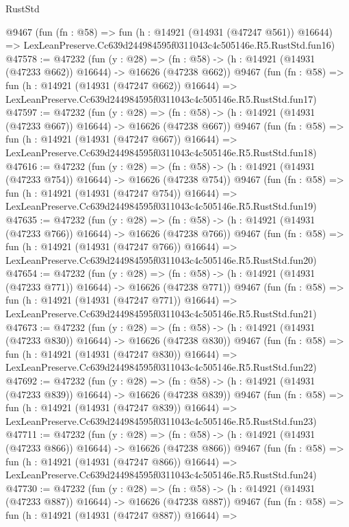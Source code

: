 \begin{lexlean}{RustStd}
\begin{coremodule}
    @9467
    (fun (fn : @58) =>
    fun (h : @14921 (@14931 (@47247 @561)) @16644) =>
    LexLeanPreserve.Cc639d244984595f0311043c4c505146e.R5.RustStd.fun16)
@47578 := @47232
    (fun (y : @28) =>
    (fn : @58) -> (h : @14921 (@14931 (@47233 @662)) @16644) -> @16626 (@47238 @662))
    @9467
    (fun (fn : @58) =>
    fun (h : @14921 (@14931 (@47247 @662)) @16644) =>
    LexLeanPreserve.Cc639d244984595f0311043c4c505146e.R5.RustStd.fun17)
@47597 := @47232
    (fun (y : @28) =>
    (fn : @58) -> (h : @14921 (@14931 (@47233 @667)) @16644) -> @16626 (@47238 @667))
    @9467
    (fun (fn : @58) =>
    fun (h : @14921 (@14931 (@47247 @667)) @16644) =>
    LexLeanPreserve.Cc639d244984595f0311043c4c505146e.R5.RustStd.fun18)
@47616 := @47232
    (fun (y : @28) =>
    (fn : @58) -> (h : @14921 (@14931 (@47233 @754)) @16644) -> @16626 (@47238 @754))
    @9467
    (fun (fn : @58) =>
    fun (h : @14921 (@14931 (@47247 @754)) @16644) =>
    LexLeanPreserve.Cc639d244984595f0311043c4c505146e.R5.RustStd.fun19)
@47635 := @47232
    (fun (y : @28) =>
    (fn : @58) -> (h : @14921 (@14931 (@47233 @766)) @16644) -> @16626 (@47238 @766))
    @9467
    (fun (fn : @58) =>
    fun (h : @14921 (@14931 (@47247 @766)) @16644) =>
    LexLeanPreserve.Cc639d244984595f0311043c4c505146e.R5.RustStd.fun20)
@47654 := @47232
    (fun (y : @28) =>
    (fn : @58) -> (h : @14921 (@14931 (@47233 @771)) @16644) -> @16626 (@47238 @771))
    @9467
    (fun (fn : @58) =>
    fun (h : @14921 (@14931 (@47247 @771)) @16644) =>
    LexLeanPreserve.Cc639d244984595f0311043c4c505146e.R5.RustStd.fun21)
@47673 := @47232
    (fun (y : @28) =>
    (fn : @58) -> (h : @14921 (@14931 (@47233 @830)) @16644) -> @16626 (@47238 @830))
    @9467
    (fun (fn : @58) =>
    fun (h : @14921 (@14931 (@47247 @830)) @16644) =>
    LexLeanPreserve.Cc639d244984595f0311043c4c505146e.R5.RustStd.fun22)
@47692 := @47232
    (fun (y : @28) =>
    (fn : @58) -> (h : @14921 (@14931 (@47233 @839)) @16644) -> @16626 (@47238 @839))
    @9467
    (fun (fn : @58) =>
    fun (h : @14921 (@14931 (@47247 @839)) @16644) =>
    LexLeanPreserve.Cc639d244984595f0311043c4c505146e.R5.RustStd.fun23)
@47711 := @47232
    (fun (y : @28) =>
    (fn : @58) -> (h : @14921 (@14931 (@47233 @866)) @16644) -> @16626 (@47238 @866))
    @9467
    (fun (fn : @58) =>
    fun (h : @14921 (@14931 (@47247 @866)) @16644) =>
    LexLeanPreserve.Cc639d244984595f0311043c4c505146e.R5.RustStd.fun24)
@47730 := @47232
    (fun (y : @28) =>
    (fn : @58) -> (h : @14921 (@14931 (@47233 @887)) @16644) -> @16626 (@47238 @887))
    @9467
    (fun (fn : @58) =>
    fun (h : @14921 (@14931 (@47247 @887)) @16644) =>

\end{coremodule}
\end{lexlean}
